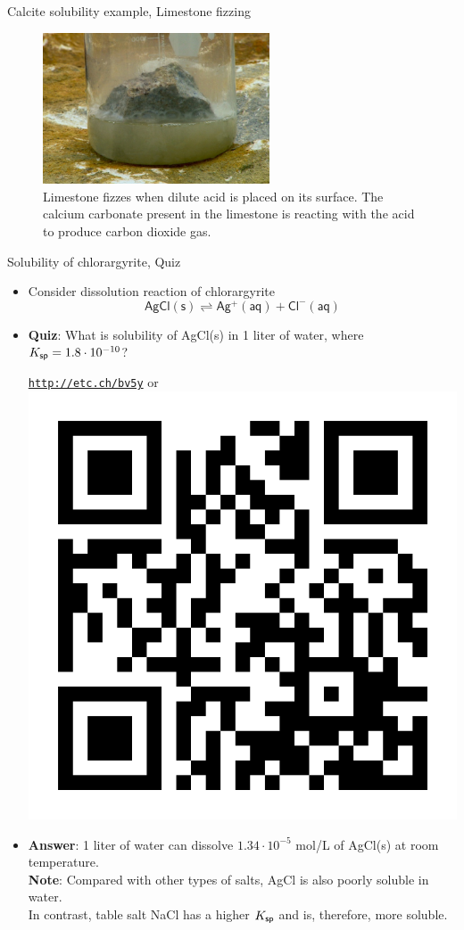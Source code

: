 %
\begin{frame}{Calcite solubility example, Limestone fizzing}

\vskip 10pt
\begin{figure}
\centering
\includegraphics[width=0.6\textwidth]{figures/chemical-equilibrium/limestone-fizzing.jpg}
\caption*{Limestone fizzes when dilute acid is placed on its surface. The calcium carbonate present in the limestone is reacting with the acid to produce carbon dioxide gas.
}
\end{figure}

\end{frame}
%
%
\begin{frame}{Solubility of chlorargyrite, Quiz}
	\begin{itemize}
		\item Consider dissolution reaction of chlorargyrite 
		\[
		\mathsf{AgCl(s) \rightleftharpoons Ag^{+}(aq) + Cl^{-}(aq)}
		\]
		\item  \alert{\bf Quiz}: What is solubility of AgCl(s) in 1 liter of water, where $K_{\sf sp} = 1.8 \cdot 10^{-10}$?
		\begin{center}
			\href{http://etc.ch/bv5y}{\textcolor{indigo(dye)}{\tt http://etc.ch/bv5y}} 
			\quad
			or 
			\quad
			\includegraphics[height=0.2\columnwidth]{figures/chemical-equilibrium/poll.png}
		\end{center}
		\hiddenpause
		\item {\bf Answer}: 1 liter of water can dissolve $1.34 \cdot 10^{-5}$ mol/L of AgCl(s) at room temperature. \\
		{\bf Note}: Compared with other types of salts, AgCl is also poorly soluble in water. \\
		In contrast, table salt NaCl has a higher $K_{\sf sp}$ and is, therefore, more soluble.
	\end{itemize}
\end{frame}		
